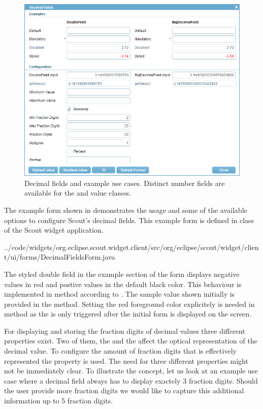 \documentclass[a4paper,10pt,twoside]{book}
\begin{document}
\begin{figure}
\includegraphics[width=15cm]{decimalfield.png}
\caption{Decimal fields and example use cases.
Distinct number fields are available for the  and  value classes.
}
\end{figure}

The example form shown in  demonstrates the usage and some of the available options to configure Scout's decimal fields.
This example form is defined in class  of the Scout widget application. 


{../code/widgets/org.eclipse.scout.widget.client/src/org/eclipse/scout/widget/client/ui/forms/DecimalFieldsForm.java}

The styled double field in the example section of the form displays negative values in red and postive values in the default black color. 
This behaviour is implemented in method  according to . 
The sample value shown initially is provided in the  method. 
Setting the red foreground color explicitely is needed in method  as the  is only triggered after the initial form is displayed on the screen. 

For displaying and storing the fraction digits of decimal values three different properties exist. 
Two of them, the  and the  affect the optical representation of the decimal value. 
To configure the amount of fraction digits that is effectively represented the property  is used. 
The need for three different properties might not be immediately clear. 
To illustrate the concept, let us look at an example use case where a decimal field always has to display exactely 3 fraction digits. 
Should the user provide more fraction digits we would like to capture this additional information up to 5 fraction digits. 
\end{document}
